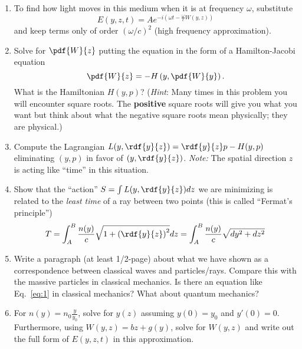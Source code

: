 \documentclass{jhwhw}
\begin{document}
\begin{enumerate}
  \item To find how light moves in this medium when it is at frequency $\omega$, substitute $$E(y,z,t) = A e^{-i(\omega t - \frac{\omega}c W(y,z))}$$ and keep terms only of order $(\omega/c)^{2}$ (high frequency approximation).
  \item Solve for $\pdf{W}{z}$ putting the equation in the form of a Hamilton-Jacobi equation
        \begin{equation}
          \label{eq:2}
          \pdf{W}{z} = - H\left(y, \pdf{W}{y}\right).
        \end{equation}
        What is the Hamiltonian $H(y, p)$? (\emph{Hint}: Many times in this problem you will encounter square roots. The {\bf positive} square roots will give you what you want but think about what the negative square roots mean physically; they are physical.)
  \item Compute the Lagrangian $L(y, \rdf{y}{z}) = \rdf{y}{z} p - H(y, p)$ eliminating $(y,p)$ in favor of $(y, \rdf{y}{z})$. \emph{Note:} The spatial direction $z$ is acting like ``time'' in this situation.
  \item Show that the ``action'' $S = \int L(y, \rdf{y}{z}) dz$ we are minimizing is related to the \emph{least time} of a ray between two points (this is called ``Fermat's principle'')
        \begin{equation}
          \label{eq:3}
          T = \int_{A}^{B} \frac{n(y)}{c} \sqrt{1 + \left(\rdf{y}{z} \right)^{2}} dz =  \int_{A}^{B} \frac{n(y)}{c} \sqrt{dy^{2} + dz^{2}}
        \end{equation}
    \item Write a paragraph (at least 1/2-page) about what we have shown as a correspondence between classical waves and particles/rays. Compare this with the massive particles in classical mechanics. Is there an equation like Eq.~\eqref{eq:1} in classical mechanics? What about quantum mechanics?
    \item For $n(y) = n_{0}\frac{y}{y_{0}}$, solve for $y(z)$ assuming $y(0) = y_{0}$ and $y'(0) = 0$. Furthermore, using $W(y,z) = b z + g(y)$, solve for $W(y,z)$ and write out the full form of $E(y,z,t)$ in this approximation.
\end{enumerate}
\end{document}
